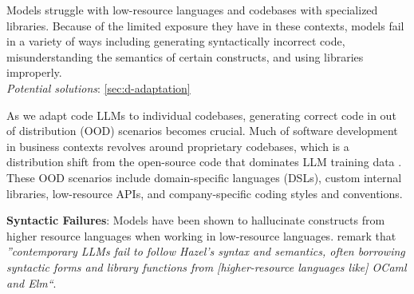\begin{tcolorbox}[colback=lightgreen, boxrule=0pt, arc=5pt, outer arc=5pt, after skip=10pt plus 2pt]
Models struggle with low-resource languages and codebases with specialized libraries. Because of the limited exposure they have in these contexts, models fail in a variety of ways including generating syntactically incorrect code, misunderstanding the semantics of certain constructs, and using libraries improperly.
\newline \\
\textit{Potential solutions}: \ref{sec:d-adaptation}
\end{tcolorbox}


As we adapt code LLMs to individual codebases, generating correct code in out of distribution (OOD) scenarios becomes crucial. Much of software development in business contexts revolves around proprietary codebases, which is a distribution shift from the open-source code that dominates LLM training data  \citep{ahmed2024studying}. These OOD scenarios include domain-specific languages (DSLs), custom internal libraries, low-resource APIs, and company-specific coding styles and conventions.


\textbf{Syntactic Failures}: Models have been shown to hallucinate constructs from higher resource languages when working in low-resource languages. \citet{blinn2024statically} remark that \textit{''contemporary LLMs fail to follow Hazel’s syntax and semantics, often borrowing syntactic forms and library functions from [higher-resource languages like] OCaml and Elm``}. 

